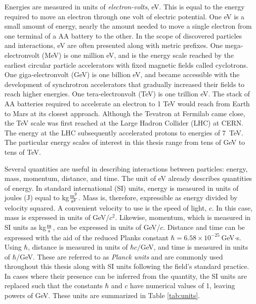 Energies are measured in units of \emph{electron-volts}, eV.
This is equal to the energy required to move an electron through one volt of electric potential.
One eV is a small amount of energy, nearly the amount needed to move a single electron from one terminal of a AA battery to the other.
In the scope of discovered particles and interactions, eV are often presented along with metric prefixes.
One mega-electronvolt (MeV) is one million eV, and is the energy scale reached by the earliest circular particle accelerators with fixed magnetic fields called cyclotrons.
One giga-electronvolt (GeV) is one billion eV, and became accessible with the development of synchrotron accelerators that gradually increased their fields to reach higher energies.
One tera-electronvolt (TeV) is one trillion eV.
The stack of AA batteries required to accelerate an electron to 1 TeV would reach from Earth to Mars at its closest approach.
Although the Tevatron at Fermilab came close, the TeV scale was first reached at the Large Hadron Collider (LHC) at CERN.
The energy at the LHC subsequently accelerated protons to energies of 7~TeV.
The particular energy scales of interest in this thesis range from tens of GeV to tens of TeV.

Several quantities are useful in describing interactions between particles: energy, mass, momentum, distance, and time.
The unit of eV already describes quantities of energy.
In standard international (SI) units, energy is measured in units of joules (J) equal to kg$\frac{\text m^2}{\text s^2}$.
Mass is, therefore, expressible as energy divided by velocity squared.
A convenient velocity to use is the speed of light, $c$.
In this case, mass is expressed in units of GeV/$c^2$.
Likewise, momentum, which is measured in SI units as kg$\frac{\text m}{\text s}$, can be expressed in units of GeV/$c$.
Distance and time can be expressed with the aid of the reduced Planks constant $\hbar=6.58\times10^{-25}~$GeV$\cdot$s.
Using $\hbar$, distance is measured in units of $\hbar c/$GeV, and time is measured in units of $\hbar/$GeV.
These are referred to as \emph{Planck units} and are commonly used throughout this thesis along with SI units following the field's standard practice.
In cases where their presence can be inferred from the quantity, the SI units are replaced such that the constants $\hbar$ and $c$ have numerical values of 1, leaving powers of GeV.
These units are summarized in Table \ref{tab:units}.

